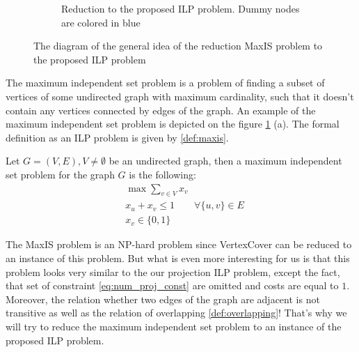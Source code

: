 \begin{figure}[ht]
\begin{subfigure}{.5\textwidth}
    \caption{Reduction to the proposed ILP problem. Dummy nodes are colored in \textcolor{blue!60}{blue}}
  \end{subfigure}
  \caption{The diagram of the general idea of the reduction MaxIS problem to the proposed ILP problem}
  \label{fig:maxis_reduction}
\end{figure}

The maximum independent set problem is a problem of finding a subset of vertices of some undirected
graph with maximum cardinality, such that it doesn't contain any vertices connected by edges of the graph.
An example of the maximum independent set problem is depicted on the figure \ref{fig:maxis_reduction} (a).
The formal definition as an ILP problem is given by \ref{def:maxis}.
\begin{definition}[MaxIS] \label{def:maxis}
  Let \( G=(V, E), V \neq \emptyset \) be an undirected graph, then a maximum independent set problem for the graph \( G \) is the following:
  \begin{align*}
    & \max \sum\limits_{v \in V} x_v                               \\
    & x_u + x_v \leq 1               \qquad \forall \{u, v\} \in E \\
    & x_v \in \{0, 1\}
  \end{align*}
\end{definition}

The MaxIS problem is an NP-hard \cite{pemmaraju2003computational} problem since VertexCover can be reduced to an instance of
this problem. But what is even more interesting for us is that this problem looks very similar to the
our projection ILP problem, except the fact, that set of constraint \eqref{eq:num_proj_const} are
omitted and costs are equal to \( 1 \). Moreover, the relation whether two edges of the graph are adjacent
is not transitive as well as the relation of overlapping \ref{def:overlapping}! That's why we will try to reduce
the maximum independent set problem to an instance of the proposed ILP problem.

